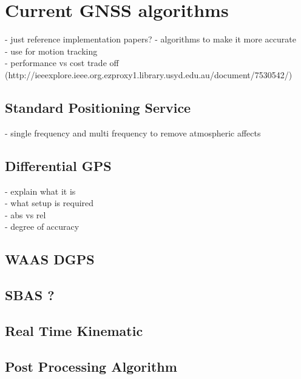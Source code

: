 \section{Current GNSS algorithms}
- just reference implementation papers?
- algorithms to make it more accurate\\
- use for motion tracking\\
- performance vs cost trade off\\
(http://ieeexplore.ieee.org.ezproxy1.library.usyd.edu.au/document/7530542/)
\subsection{Standard Positioning Service}
- single frequency and multi frequency to remove atmospheric affects
\subsection{Differential GPS}
- explain what it is\\
- what setup is required \\
- abs vs rel \\
- degree of accuracy
\subsection{WAAS DGPS}

\subsection{SBAS  ?}

\subsection{Real Time Kinematic}

\subsection{Post Processing Algorithm}


